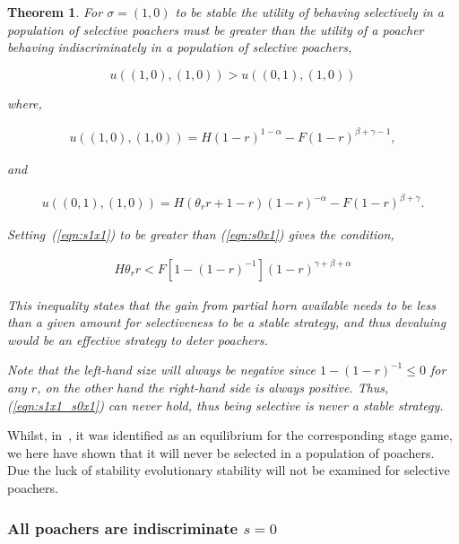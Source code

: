 \documentclass[10pt]{article}
\newtheorem{theorem}{Theorem}
\begin{document}
\begin{theorem}
	For \(\sigma=(1, 0)\) to be stable the utility of behaving selectively in 
	a population of selective poachers 	must be greater than the utility of a 
	poacher behaving indiscriminately in a population of selective poachers,

	\begin{equation}
	u((1, 0),(1, 0)) > u((0, 1),(1, 0))
	\end{equation}
	
	where,
	
	\begin{eqnarray}
	\label{eqn:s1x1}
 	u((1, 0),(1, 0)) = H(1 - r)^{1 - \alpha} - F(1 - r)^{\beta + \gamma - 1},
	\end{eqnarray}
	
	and 
	
	\begin{eqnarray}
	\label{eqn:s0x1}
	u((0, 1),(1, 0)) = H(\theta_r r +1 - r)(1 - r)^{-\alpha} - F(1 - r)^{\beta + \gamma} .
	\end{eqnarray}

	Setting~(\ref{eqn:s1x1}) to be greater than (\ref{eqn:s0x1}) gives the 
	condition,

	\begin{eqnarray}
	\label{eqn:s1x1_s0x1}
	H \theta_r r < F [1 - (1 - r)^{-1}](1 - r)^{\gamma + \beta + \alpha}
	\end{eqnarray}


	This inequality states that the gain from partial horn available needs to be less
	than a given amount for selectiveness to be a stable strategy, and thus devaluing
	would be  an effective strategy to deter poachers.

	Note that the left-hand size  will always be negative since \(1-(1-r)^{-1} \leq 0\)
	for any \(r\), on the other hand the right-hand side is always positive.
	Thus, (\ref{eqn:s1x1_s0x1}) can never hold, thus being selective is never
	a stable strategy.
\end{theorem}

Whilst, in~\cite{Lee}, it was identified as an equilibrium for the corresponding
stage game, we here have shown that it will never be selected in a population 
of poachers. Due the luck of stability evolutionary stability will not be examined
for selective poachers.

\subsubsection{All poachers are indiscriminate \(s=0\)}
\end{document}
